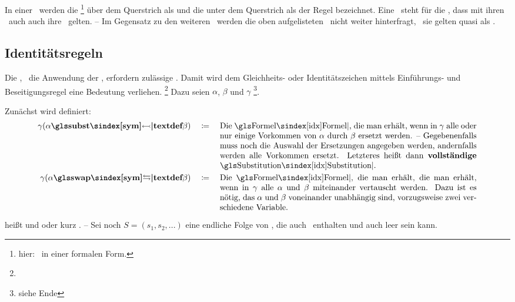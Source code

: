 {In einer \Schlussregel\ werden die \Formeln%
\footnote{hier: \Aussagen\ in einer formalen Form.}
über dem Querstrich als  und die unter dem Querstrich als  der Regel bezeichnet.
Eine \Schlussregel\ steht für die \Aussage, dass mit ihren \Voraussetzungen\ auch auch ihre \Folgerungen\ gelten.
-- Im Gegensatz zu den weiteren \Schlussregeln\ werden die oben aufgelisteten \Basisregeln\ nicht weiter hinterfragt, \textdh\ sie gelten quasi als \Axiome.

\subsection{Identitätsregeln}%
\label{sub:Identitätsregeln}

Die , \textdh\ die Anwendung der \Schlussregeln, erfordern zulässige \Substitutionen.
Damit wird dem Gleichheits- oder Identitätszeichen \chrqt{\symeq} mittels Einführungs- und Beseitigungsregel eine Bedeutung verliehen.%
\footnote{}
Dazu seien $\alpha$, $\beta$ und $\gamma$ \vergleichbare\footnote{siehe Ende }\Formeln.

Zunächst wird definiert:
\begin{align}
	\gamma(\alpha \definition{\symsubst} \beta) \quad \defeq \quad
	\parbox[t]{11cm}{%
		Die \Formel, die man erhält, wenn in $\gamma$ alle oder nur einige Vorkommen von $\alpha$ durch $\beta$ ersetzt werden.
		-- Gegebenenfalls muss noch die Auswahl der Ersetzungen angegeben werden, andernfalls werden alle Vorkommen ersetzt.
		Letzteres heißt dann \defn{vollständige} \Substitution.
	} \label{def:SubstitutionAlt}\\
	\gamma(\alpha \definition{\symswap} \beta) \quad \defeq \quad
	\parbox[t]{11cm}{%
		Die \Formel, die man erhält, die man erhält, wenn in $\gamma$ alle $\alpha$ und $\beta$ miteinander vertauscht werden.
		Dazu ist es nötig, das $\alpha$ und $\beta$ voneinander unabhängig sind, vorzugsweise zwei verschiedene Variable.
	} \label{def:Vertauschung}
\end{align}

\seqqt{$ \alpha \symsubst \beta $} heißt  und \seqqt{$ \alpha \symswap \beta $}  oder kurz .
-- Sei noch $S = (s_1, s_2, ...)$ eine endliche Folge von \Substitutionen, die auch \Vertauschungen\ enthalten und auch leer sein kann.

}

